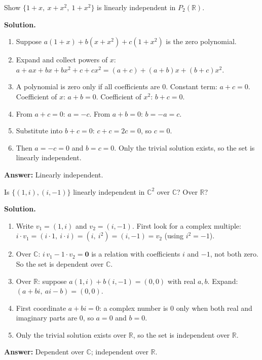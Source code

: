 \documentclass[11pt]{article}
\begin{document}
\begin{tcolorbox}[colback=white,colframe=ink!60,title={\bfseries Example 5 \textperiodcentered\ Independence in $P_{2}$}]Show $\{1+x,\ x+x^{2},\ 1+x^{2}\}$ is linearly independent in $P_{2}(\mathbb{R})$.
\par\smallskip
\textbf{Solution.} \begin{enumerate}[leftmargin=1.6em,itemsep=1pt,topsep=2pt,label=\arabic*.]\item Suppose $a(1+x)+b(x+x^{2})+c(1+x^{2})$ is the zero polynomial.
\item Expand and collect powers of $x$: $a+ax+bx+bx^{2}+c+cx^{2}=(a+c)+(a+b)x+(b+c)x^{2}$.
\item A polynomial is zero only if all coefficients are $0$. Constant term: $a+c=0$. Coefficient of $x$: $a+b=0$. Coefficient of $x^{2}$: $b+c=0$.
\item From $a+c=0$: $a=-c$. From $a+b=0$: $b=-a=c$.
\item Substitute into $b+c=0$: $c+c=2c=0$, so $c=0$.
\item Then $a=-c=0$ and $b=c=0$. Only the trivial solution exists, so the set is linearly independent.
\end{enumerate}\textbf{Answer:} Linearly independent.
\end{tcolorbox}
\begin{tcolorbox}[colback=white,colframe=ink!60,title={\bfseries Example 6 \textperiodcentered\ The field matters}]Is $\{(1,i),(i,-1)\}$ linearly independent in $\mathbb{C}^{2}$ over $\mathbb{C}$? Over $\mathbb{R}$?
\par\smallskip
\textbf{Solution.} \begin{enumerate}[leftmargin=1.6em,itemsep=1pt,topsep=2pt,label=\arabic*.]\item Write $v_1=(1,i)$ and $v_2=(i,-1)$. First look for a complex multiple: $i\cdot v_1=(i\cdot1,\ i\cdot i)=(i,\ i^{2})=(i,-1)=v_2$ (using $i^{2}=-1$).
\item Over $\mathbb{C}$: $i\,v_1-1\cdot v_2=\mathbf 0$ is a relation with coefficients $i$ and $-1$, not both zero. So the set is dependent over $\mathbb{C}$.
\item Over $\mathbb{R}$: suppose $a(1,i)+b(i,-1)=(0,0)$ with real $a,b$. Expand: $(a+bi,\ ai-b)=(0,0)$.
\item First coordinate $a+bi=0$: a complex number is $0$ only when both real and imaginary parts are $0$, so $a=0$ and $b=0$.
\item Only the trivial solution exists over $\mathbb{R}$, so the set is independent over $\mathbb{R}$.
\end{enumerate}\textbf{Answer:} Dependent over $\mathbb{C}$; independent over $\mathbb{R}$.
\end{tcolorbox}
\end{document}
